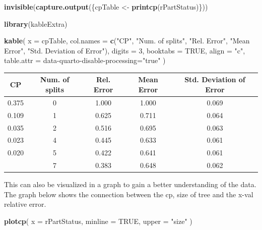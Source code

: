 \documentclass[
]{article}
\newenvironment{Shaded}{\begin{snugshade}}{\end{snugshade}}
\newcommand{\AttributeTok}[1]{\textcolor[rgb]{0.13,0.29,0.53}{#1}}
\newcommand{\ConstantTok}[1]{\textcolor[rgb]{0.56,0.35,0.01}{#1}}
\newcommand{\DecValTok}[1]{\textcolor[rgb]{0.00,0.00,0.81}{#1}}
\newcommand{\FunctionTok}[1]{\textcolor[rgb]{0.13,0.29,0.53}{\textbf{#1}}}
\newcommand{\NormalTok}[1]{#1}
\newcommand{\OtherTok}[1]{\textcolor[rgb]{0.56,0.35,0.01}{#1}}
\newcommand{\StringTok}[1]{\textcolor[rgb]{0.31,0.60,0.02}{#1}}
\begin{document}
\begin{Shaded}
\begin{Highlighting}[]
\FunctionTok{invisible}\NormalTok{(}\FunctionTok{capture.output}\NormalTok{(\{cpTable }\OtherTok{\textless{}{-}} \FunctionTok{printcp}\NormalTok{(rPartStatus)\}))}

\FunctionTok{library}\NormalTok{(kableExtra)}

\FunctionTok{kable}\NormalTok{(}
  \AttributeTok{x =}\NormalTok{ cpTable,}
  \AttributeTok{col.names =} \FunctionTok{c}\NormalTok{(}\StringTok{"CP"}\NormalTok{, }\StringTok{"Num. of splits"}\NormalTok{, }\StringTok{"Rel. Error"}\NormalTok{,}
                \StringTok{"Mean Error"}\NormalTok{, }\StringTok{"Std. Deviation of Error"}\NormalTok{),}
  \AttributeTok{digits =} \DecValTok{3}\NormalTok{,}
  \AttributeTok{booktabs =} \ConstantTok{TRUE}\NormalTok{,}
  \AttributeTok{align =} \StringTok{"c"}\NormalTok{,}
  \AttributeTok{table.attr =} \StringTok{\textquotesingle{}data{-}quarto{-}disable{-}processing="true"\textquotesingle{}}
\NormalTok{)}
\end{Highlighting}
\end{Shaded}

\begin{tabular}{ccccc}
\toprule
CP & Num. of splits & Rel. Error & Mean Error & Std. Deviation of Error\\
\midrule
0.375 & 0 & 1.000 & 1.000 & 0.069\\
0.109 & 1 & 0.625 & 0.711 & 0.064\\
0.035 & 2 & 0.516 & 0.695 & 0.063\\
0.023 & 4 & 0.445 & 0.633 & 0.061\\
0.020 & 5 & 0.422 & 0.641 & 0.061\\
\addlinespace
0.010 & 7 & 0.383 & 0.648 & 0.062\\
\bottomrule
\end{tabular}

This can also be visualized in a graph to gain a better understanding of
the data. The graph below shows the connection between the cp, size of
tree and the x-val relative error.

\begin{Shaded}
\begin{Highlighting}[]
\FunctionTok{plotcp}\NormalTok{(}
  \AttributeTok{x =}\NormalTok{ rPartStatus,}
  \AttributeTok{minline =} \ConstantTok{TRUE}\NormalTok{,}
  \AttributeTok{upper =} \StringTok{"size"}
\NormalTok{)}
\end{Highlighting}
\end{Shaded}
\end{document}
